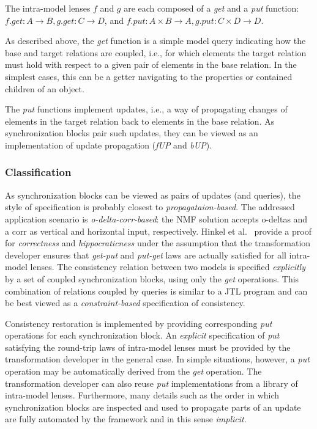 The intra-model lenses $f$ and $g$ are each composed of a \emph{get} and a \emph{put} function:  $f.get: A \rightarrow B, g.get: C \rightarrow D$, and $f.put: A \times B \rightarrow A, g.put:  C \times D \rightarrow D$.

As described above, the \emph{get} function is a simple model query indicating how the base and target relations are coupled, i.e., for which elements the target relation must hold with respect to a given pair of elements in the base relation.
In the simplest cases, this can be a getter navigating to the properties or contained children of an object.

The \emph{put} functions implement updates, i.e., a way of propagating changes of elements in the target relation back to elements in the base relation.
As synchronization blocks pair such updates, they can be viewed as an implementation of update propagation (\emph{fUP} and \emph{bUP}).

\subsubsection{Classification}
\label{sec:ClassificationNMF}

As synchronization blocks can be viewed as pairs of updates (and queries), the style of specification is probably closest to \emph{propagataion-based}.
%
The addressed application scenario is \emph{o-delta-corr-based}: the NMF solution accepts o-deltas and a corr as vertical and horizontal input, respectively.
%
Hinkel et al.~\cite{SoSyM2017-Hinkel} provide a proof for \emph{correctness} and \emph{hippocraticness} under the assumption that the transformation developer ensures that \emph{get-put} and \emph{put-get} laws are actually satisfied for all intra-model lenses.
%
The consistency relation between two models is specified \emph{explicitly} by a set of coupled synchronization blocks, using only the \emph{get} operations.
This combination of relations coupled by queries is similar to a JTL program and can be best viewed as a \emph{constraint-based} specification of consistency. 

Consistency restoration is implemented by providing corresponding \emph{put} operations for each synchronization block.
An \emph{explicit} specification of \emph{put} satisfying the round-trip laws of intra-model lenses must be provided by the transformation developer in the general case.
In simple situations, however, a \emph{put} operation may be automatically derived from the \emph{get} operation.
The transformation developer can also reuse \emph{put} implementations from a library of intra-model lenses.
Furthermore, many details such as the order in which synchronization blocks are inspected and used to propagate parts of an update are fully automated by the framework and in this sense \emph{implicit}.

